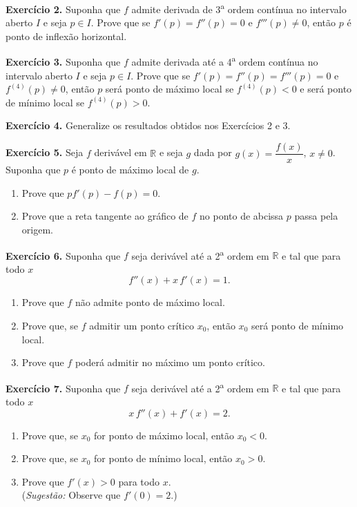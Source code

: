 \documentclass[12pt,a4paper]{article}
\begin{document}
\vspace{0.5cm}
\noindent\textbf{Exercício 2.} Suponha que $f$ admite derivada de 3\textsuperscript{a} ordem contínua no intervalo aberto $I$ e seja $p \in I$. Prove que se $f'(p) = f''(p) = 0$ e $f'''(p) \neq 0$, então $p$ é ponto de inflexão horizontal.

\vspace{0.5cm}
\noindent\textbf{Exercício 3.} Suponha que $f$ admite derivada até a 4\textsuperscript{a} ordem contínua no intervalo aberto $I$ e seja $p \in I$. Prove que se $f'(p) = f''(p) = f'''(p) = 0$ e $f^{(4)}(p) \neq 0$, então $p$ será ponto de máximo local se $f^{(4)}(p) < 0$ e será ponto de mínimo local se $f^{(4)}(p) > 0$.

\vspace{0.5cm}
\noindent\textbf{Exercício 4.} Generalize os resultados obtidos nos Exercícios 2 e 3.

\vspace{0.5cm}
\noindent\textbf{Exercício 5.} Seja $f$ derivável em $\mathbb{R}$ e seja $g$ dada por $g(x) = \dfrac{f(x)}{x}$, $x \neq 0$. Suponha que $p$ é ponto de máximo local de $g$.
\begin{enumerate}
    \renewcommand{\theenumi}{\alph{enumi}}
    \renewcommand{\labelenumi}{\theenumi)}
    \item Prove que $pf'(p) - f(p) = 0$.
    \item Prove que a reta tangente ao gráfico de $f$ no ponto de abcissa $p$ passa pela origem.
\end{enumerate}

\vspace{0.5cm}
\noindent\textbf{Exercício 6.} Suponha que $f$ seja derivável até a 2\textsuperscript{a} ordem em $\mathbb{R}$ e tal que para todo $x$
\[
f''(x) + x\,f'(x) = 1.
\]
\begin{enumerate}
    \renewcommand{\theenumi}{\alph{enumi}}
    \renewcommand{\labelenumi}{\theenumi)}
    \item Prove que $f$ não admite ponto de máximo local.
    \item Prove que, se $f$ admitir um ponto crítico $x_0$, então $x_0$ será ponto de mínimo local.
    \item Prove que $f$ poderá admitir no máximo um ponto crítico.
\end{enumerate}

\vspace{0.5cm}
\noindent\textbf{Exercício 7.} Suponha que $f$ seja derivável até a 2\textsuperscript{a} ordem em $\mathbb{R}$ e tal que para todo $x$
\[
x\,f''(x) + f'(x) = 2.
\]
\begin{enumerate}
    \renewcommand{\theenumi}{\alph{enumi}}
    \renewcommand{\labelenumi}{\theenumi)}
    \item Prove que, se $x_0$ for ponto de máximo local, então $x_0 < 0$.
    \item Prove que, se $x_0$ for ponto de mínimo local, então $x_0 > 0$.
    \item Prove que $f'(x) > 0$ para todo $x$.\\
    (\textit{Sugestão:} Observe que $f'(0) = 2$.)
\end{enumerate}
\end{document}
